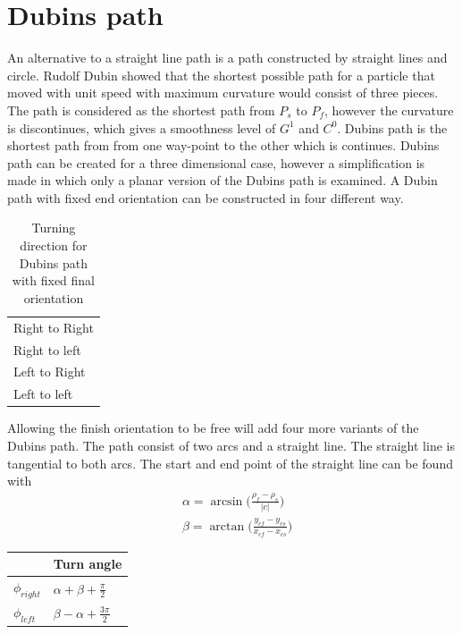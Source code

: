\section{Dubins path}\label{S:DubinsPath}
An alternative to a straight line path is a path constructed by straight lines and circle. Rudolf Dubin showed \citep{dubins1957curves} that the shortest possible path for a particle that moved with unit speed with maximum curvature would consist of three pieces. The path is considered as the shortest path from $P_s$ to $P_f$, however the curvature is discontinues, which gives a smoothness level of $G^1$ and $C^0$. 
Dubins path is the shortest path from from one way-point to the other which is continues. Dubins path can be created for a three dimensional case, however a simplification is made in which only a planar version of the Dubins path is examined. A Dubin path with fixed end orientation can be constructed in four different way.
\begin{table}[H]
\centering
\begin{adjustbox}{max width=\textwidth}
\begin{tabular}{ | l |}
\hline
Right to Right \\
Right to left \\
Left to Right \\
Left to left \\ \hline
\end{tabular}
\end{adjustbox}
\caption{Turning direction for Dubins path with fixed final orientation}
\label{Tb:DubinsTurningDirection}
\end{table}

Allowing the finish orientation to be free will add four more variants of the Dubins path.
The path consist of two arcs and a straight line. The straight line is tangential to both arcs. The start and end point of the straight line can be found with
\begin{subequations}
\begin{align}
& \alpha = \arcsin\big(\frac{\rho_f-\rho_s}{|c|}\big) \\
& \beta = \arctan\big(\frac{y_{cf}-y_{cs}}{x_{cf}-x_{cs}}\big)
\end{align}
\end{subequations}

\begin{table}[H]
\begin{center}
\begin{tabular}{ | l | | l |}
\hline
& \textbf{Turn angle} \\ \hline
$\phi_{right}$ & $\alpha + \beta + \frac{\pi}{2}$ \\
$\phi_{left}$ & $\beta - \alpha + \frac{3\pi}{2}$ \\ \hline
\end{tabular}
\end{center}
\end{table}

